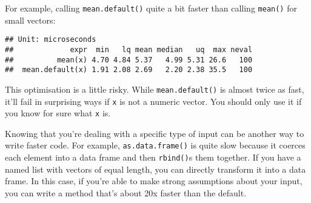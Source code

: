 For example, calling \texttt{mean.default()} quite a bit faster than
calling \texttt{mean()} for small vectors:

\begin{Shaded}
\begin{Highlighting}[]
\StringTok{ }\NormalTok{(}\NormalTok{)}

\NormalTok{(}
\NormalTok{)}
\end{Highlighting}
\end{Shaded}

\begin{verbatim}
## Unit: microseconds
##             expr  min   lq mean median   uq  max neval
##          mean(x) 4.70 4.84 5.37   4.99 5.31 26.6   100
##  mean.default(x) 1.91 2.08 2.69   2.20 2.38 35.5   100
\end{verbatim}

This optimisation is a little risky. While \texttt{mean.default()} is
almost twice as fast, it'll fail in surprising ways if \texttt{x} is not
a numeric vector. You should only use it if you know for sure what
\texttt{x} is.

Knowing that you're dealing with a specific type of input can be another
way to write faster code. For example, \texttt{as.data.frame()} is quite
slow because it coerces each element into a data frame and then
\texttt{rbind()}s them together. If you have a named list with vectors
of equal length, you can directly transform it into a data frame. In
this case, if you're able to make strong assumptions about your input,
you can write a method that's about 20x faster than the default.

\begin{Shaded}
\begin{Highlighting}[]
\StringTok{ }
  \NormalTok{) <-}\StringTok{ }\NormalTok{(}\NormalTok{(l[[}\NormalTok{]]))}
\NormalTok{\}}

\StringTok{ }\NormalTok{(}\OperatorTok{:}\NormalTok{, }\NormalTok{(}\NormalTok{))}
\StringTok{ }

\NormalTok{(}
   
   
\NormalTok{)}
\end{Highlighting}
\end{Shaded}

